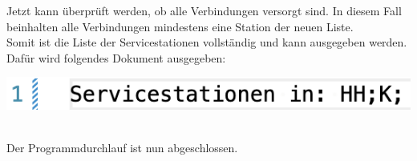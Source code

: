 Jetzt kann überprüft werden, ob alle Verbindungen versorgt sind. In diesem Fall beinhalten alle Verbindungen mindestens eine Station der neuen Liste.\\
Somit ist die Liste der Servicestationen vollständig und kann ausgegeben werden.\\

Dafür wird folgendes Dokument ausgegeben:\\
\begin{center}
    \includegraphics[width=\linewidth]{images/Programmdurchlauf/ausgabedatei.png}
    \label{test:subsecpar:ausgabedatei}
\end{center}
\\
Der Programmdurchlauf ist nun abgeschlossen.\\
